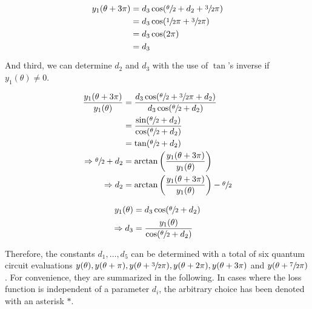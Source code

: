 \begin{equation}
    \label{eq:whateverman2-the-second}
    \begin{split}
        y_1(\theta + 3\pi)
            &= d_3 \cos(\sfrac\theta2 + d_2 + \sfrac32\pi)\\
            &= d_3 \cos(\sfrac12\pi + \sfrac32\pi)\\
            &= d_3 \cos(2\pi)\\
            &= d_3
    \end{split}
\end{equation}

And third, we can determine $d_2$ and $d_3$ with the use of $\tan$'s inverse if
$y_1(\theta) \neq 0$.

\begin{equation}
    \label{eq:d2}
    \begin{split}
        \frac{y_1(\theta + 3\pi)}{y_1(\theta)}
            &= \frac{d_3 \cos(\sfrac\theta2 + \sfrac32 \pi + d_2)}{d_3 \cos(\sfrac\theta2 + d_2)} \\
            &= \frac{\sin(\sfrac\theta2 + d_2)}{\cos(\sfrac\theta2 + d_2)} \\
            &= \tan(\sfrac\theta2 + d_2) \\
        \Rightarrow \sfrac\theta2 + d_2
            &= \arctan\left(\frac{y_1(\theta + 3\pi)}{y_1(\theta)}\right) \\
        \Rightarrow d_2
            &= \arctan\left(\frac{y_1(\theta + 3\pi)}{y_1(\theta)}\right) - \sfrac\theta2
    \end{split}
\end{equation}

\begin{equation}
    \label{eq:d3}
    \begin{split}
        y_1(\theta)
            &= d_3 \cos(\sfrac\theta2 + d_2) \\
        \Rightarrow d_3
            &= \frac{y_1(\theta)}{\cos(\sfrac\theta2 + d_2)}
    \end{split}
\end{equation}

Therefore, the constants $d_1, \dots, d_5$ can be determined with a total of six
quantum circuit evaluations
$y(\theta), y(\theta + \pi), y(\theta + \sfrac32\pi), y(\theta + 2\pi), y(\theta + 3\pi)$
and $y(\theta + \sfrac72\pi)$.
For convenience, they are summarized in the following.
In cases where the loss function is independent of a parameter $d_i$, the
arbitrary choice has been denoted with an asterisk $*$.

